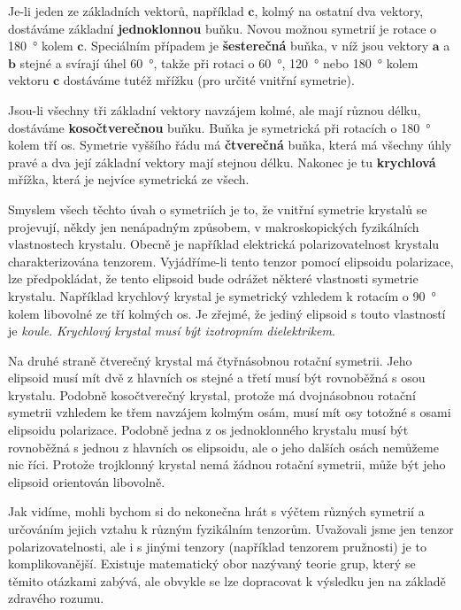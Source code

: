     Je-li jeden ze základních vektorů, například \(\bm{c}\), kolmý na ostatní dva vektory, 
    dostáváme základní \textbf{jednoklonnou} buňku. Novou možnou symetrií je rotace o 
    \qty{180}{\degree} kolem \(\bm{c}\). Speciálním případem je \textbf{šesterečná} buňka, v níž 
    jsou vektory \(\bm{a}\) a \(\bm{b}\) stejné a svírají úhel \qty{60}{\degree}, takže při rotaci o 
    \qty{60}{\degree}, \qty{120}{\degree} nebo \qty{180}{\degree} kolem vektoru \(\bm{c}\) dostáváme 
    tutéž mřížku (pro určité vnitřní symetrie).
    
    Jsou-li všechny tři základní vektory navzájem kolmé, ale mají různou délku, dostáváme 
    \textbf{kosočtverečnou} buňku. Buňka je symetrická při rotacích o \qty{180}{\degree} kolem tří 
    os. Symetrie vyššího řádu má \textbf{čtverečná} buňka, která má všechny úhly pravé a dva její 
    základní vektory mají stejnou délku. Nakonec je tu \textbf{krychlová} mřížka, která je nejvíce 
    symetrická ze všech.
    
    Smyslem všech těchto úvah o symetriích je to, že vnitřní symetrie krystalů se projevují, někdy 
    jen nenápadným způsobem, v makroskopických fyzikálních vlastnostech krystalu. Obecně je 
    například elektrická polarizovatelnost krystalu charakterizována tenzorem. Vyjádříme-li tento 
    tenzor pomocí elipsoidu polarizace, lze předpokládat, že tento elipsoid bude odrážet některé 
    vlastnosti symetrie krystalu. Například krychlový krystal je symetrický vzhledem k rotacím o 
    \qty{90}{\degree} kolem libovolné ze tří kolmých os. Je zřejmé, že jediný elipsoid s touto 
    vlastností je \emph{koule}. \emph{Krychlový krystal musí být izotropním dielektrikem}.
    
    Na druhé straně čtverečný krystal má čtyřnásobnou rotační symetrii. Jeho elipsoid musí mít dvě 
    z hlavních os stejné a třetí musí být rovnoběžná s osou krystalu. Podobně kosočtverečný 
    krystal, protože má dvojnásobnou rotační symetrii vzhledem ke třem navzájem kolmým osám, musí 
    mít osy totožné s osami elipsoidu polarizace. Podobně jedna z os jednoklonného krystalu musí 
    být rovnoběžná s jednou z hlavních os elipsoidu, ale o jeho dalších osách nemůžeme nic říci. 
    Protože trojklonný krystal nemá žádnou rotační symetrii, může být jeho elipsoid orientován 
    libovolně.
    
    Jak vidíme, mohli bychom si do nekonečna hrát s výčtem různých symetrií a určováním jejich 
    vztahu k různým fyzikálním tenzorům. Uvažovali jsme jen tenzor polarizovatelnosti, ale i s 
    jinými tenzory (například tenzorem pružnosti) je to komplikovanější. Existuje matematický obor 
    nazývaný teorie grup, který se těmito otázkami zabývá, ale obvykle se lze dopracovat k výsledku 
    jen na základě zdravého rozumu.
    
